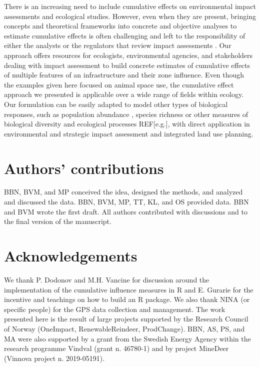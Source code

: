 \documentclass[titlepage]{article}
\begin{document}
{There is an increasing need to include cumulative effects on environmental impact assessments and ecological studies. However, even when they are present, bringing concepts and theoretical frameworks into concrete and objective analyses to estimate cumulative effects is often challenging and left to the responsibility of either the analysts or the regulators that review impact assessments \citep{johnson_regulating_2011}. Our approach offers resources for ecologists, environmental agencies, and stakeholders dealing with impact assessment to build concrete estimates of cumulative effects of multiple features of an infrastructure and their zone influence. 
Even though the examples given here focused on animal space use, the cumulative effect approach we presented is applicable over a wide range
of fields within ecology. Our formulation can be easily adapted to model other types of biological responses, such as population abundance \citep[e.g.][]{benitez-lopez_impacts_2010},
species richness \citep[e.g.][]{ficetola_ecological_2009} or other measures of biological diversity and ecological processes REF[e.g.], with direct application in environmental and strategic impact assessment and integrated land use planning.
      
\section*{Authors’ contributions}

BBN, BVM, and MP conceived the idea, designed the methods, and analyzed and discussed the data. BBN, BVM, MP, TT, KL, and OS provided data. BBN and BVM wrote the first draft. All authors contributed with discussions and to the final version of the manuscript.

\section*{Acknowledgements}

We thank P. Dodonov and M.H. Vancine for discussion around the implementation of the cumulative influence measures in R and E. Gurarie for the incentive and teachings on how to build an R package. We also thank NINA (or specific people) for the GPS data collection and management. The work presented here is the result of large projects supported by the Research Council of Norway (OneImpact, RenewableReindeer, ProdChange). BBN, AS, PS, and MA were also supported by a grant from the Swedish Energy Agency within the research programme Vindval (grant n. 46780-1) and by project MineDeer (Vinnova project n. 2019-05191).

}
\end{document}
